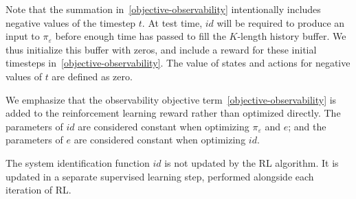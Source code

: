 \documentclass{article}
\newcommand{\TODO}[1]{\textcolor{red}{\textbf{TODO: #1}}}
\newcommand{\embedfn}{e}
\newcommand{\idfn}{id}
\newcommand{\latvar}{\varepsilon}
\newcommand{\secref}[1]{Section \ref{#1}}
\begin{document}
Note that the summation in~\eqref{objective-observability} intentionally includes negative values of the timestep $t$.
At test time, $\idfn$ will be required to produce an input to $\pi_\latvar$
before enough time has passed to fill the $K$-length history buffer.
We thus initialize this buffer with zeros, and include a reward for these initial timesteps in~\eqref{objective-observability}.
The value of states and actions for negative values of $t$ are defined as zero.

We emphasize that the observability objective term~\eqref{objective-observability}
is added to the reinforcement learning reward rather than optimized directly.
The parameters of $\idfn$ are considered constant when optimizing $\pi_\latvar$ and $e$;
and the parameters of $\embedfn$ are considered constant when optimizing $\idfn$.

The system identification function $\idfn$ is not updated by the RL algorithm.
It is updated in a separate supervised learning step, performed alongside each iteration of RL.

\end{document}
